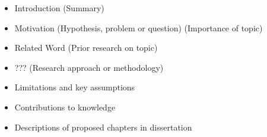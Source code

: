 \documentclass[twoside]{article}
\begin{document}
\begin{itemize}
\item Introduction (Summary)
\item Motivation (Hypothesis, problem or question) (Importance of topic)
\item Related Word (Prior research on topic)
\item ??? (Research approach or methodology)
\item Limitations and key assumptions
\item Contributions to knowledge
\item Descriptions of proposed chapters in dissertation
\end{itemize}

{\small %

}
\end{document}
